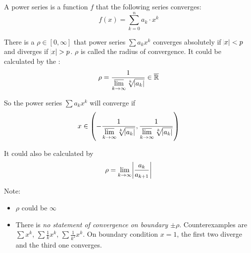 \begin{definition}
    A power series is a function $f$ that the following series converges:
    \begin{equation}
        f(x) = \sum_{k=0}^n a_k \cdot x^k
    \end{equation}
\end{definition}

\begin{theorem}
    There is a $\rho \in [0, \infty]$ that power series $\sum a_k x^k$ converges absolutely if $\abs{x} < p$ and diverges if $\abs{x} > p$. $\rho$ is called the radius of convergence. It could be calculated by the :
    \begin{equation}
        \rho = \frac{1}{\displaystyle \varlimsup_{k \rightarrow \infty} \sqrt[k]{\abs{a_k}} } \in \overline{\mathbb{R}}
    \end{equation}
    
    So the power series $\sum a_k x^k$ will converge if
    \begin{equation}
        x \in \mleft(- \frac{1}{\displaystyle \varlimsup_{k \rightarrow \infty} \sqrt[k]{\absolutevalue{a_k}} }, \frac{1}{\displaystyle \varlimsup_{k \rightarrow \infty} \sqrt[k]{\absolutevalue{a_k}} } \mright)
    \end{equation}
    
    It could also be calculated by 
    \begin{equation}
        \rho = \lim_{k \rightarrow \infty} \abs{\frac{a_k}{a_{k+1}}}
    \end{equation}
    
    Note:
    \begin{itemize}
        \item $\rho$ could be $\infty$
        \item There is \emph{no statement of convergence on boundary $\pm \rho$}. Counterexamples are $\sum x^k$, $\sum \frac{1}{k} x^k$, $\sum \frac{1}{k^2} x^k$. On boundary condition $x=1$, the first two diverge and the third one converges.
    \end{itemize}
    
     
\end{theorem}











